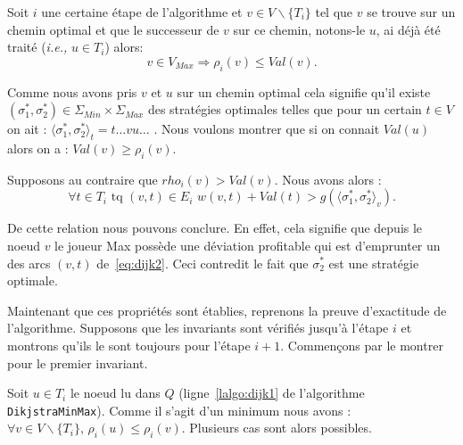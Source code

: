 \begin{propriete}
	\label{prop:dijk2}
	Soit $i$ une certaine étape de l'algorithme et $v \in V\backslash \{ T_i \}$ tel que $v$ se trouve sur un chemin optimal et que le successeur de $v$ sur ce chemin, notons-le $u$, ai déjà été traité (\emph{i.e.,} $u \in T_i$) alors:
	$$ v \in V_{Max} \Rightarrow \rho_i(v) \leq Val(v).$$
\end{propriete}

\begin{demonstration} 
	$\text{}$\\
	Comme nous avons pris $v$ et $u$ sur un chemin optimal cela signifie qu'il existe $(\sigma_1^*, \sigma_2^*) \in \Sigma_{Min} \times \Sigma_{Max}$ des stratégies optimales telles que pour un certain $t \in V$ on ait : $\langle \sigma_1^*, \sigma_2^* \rangle_t = t\ldots vu\ldots$ .
Nous voulons montrer que si on connait $Val(u)$ alors on a : $Val(v) \geq \rho_i(v)$.

Supposons au contraire que $ rho_i(v) > Val(v)$. Nous avons alors : 
\begin{equation} \forall t \in T_i \text{ tq } (v,t)\in E_i \,\, w(v,t) + Val(t) > g(\langle \sigma_1^*, \sigma_2^*\rangle_v). \label{eq:dijk2}\end{equation}

De cette relation nous pouvons conclure. En effet, cela signifie que depuis le noeud $v$ le joueur Max possède une déviation profitable qui est d'emprunter un des arcs $(v,t)$ de~\eqref{eq:dijk2}. Ceci contredit le fait que $\sigma_2^*$ est une stratégie optimale.
	
\end{demonstration}

Maintenant que ces propriétés sont établies, reprenons la preuve d'exactitude de l'algorithme. Supposons que les invariants sont vérifiés jusqu'à l'étape $i$ et montrons qu'ils le sont toujours pour l'étape $i+1$.
Commençons par le montrer pour le premier invariant.

Soit $u \in T_i$ le noeud lu dans $Q$ (ligne~\ref{lalgo:dijk1} de l'algorithme \verb|DikjstraMinMax|). Comme il s'agit d'un minimum nous avons : $\forall v \in V\backslash \{ T_i \},\, \rho_i(u) \leq \rho_i(v)$. Plusieurs cas sont alors possibles.

